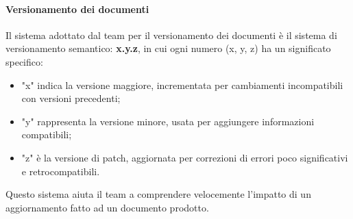 \documentclass[10pt]{article}
\begin{document}
\begin{justify}
        \paragraph{Versionamento dei documenti}
        Il sistema adottato dal team per il versionamento dei documenti è il sistema di versionamento semantico: \textbf{x.y.z}, in cui ogni numero (x, y, z) ha un significato specifico:\\
        \begin{itemize}
            \item "x" indica la versione maggiore, incrementata per cambiamenti incompatibili con versioni precedenti;
            \item "y" rappresenta la versione minore, usata per aggiungere informazioni compatibili;
            \item "z" è la versione di patch, aggiornata per correzioni di errori poco significativi e retrocompatibili.
        \end{itemize} 
        Questo sistema aiuta il team a comprendere velocemente l'impatto di un aggiornamento fatto ad un documento prodotto.\\


\end{justify}
\end{document}
